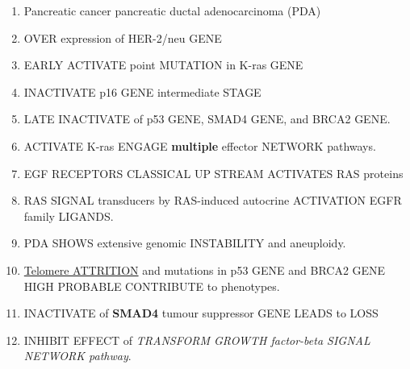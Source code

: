 \begin{enumerate}
	\item Pancreatic cancer pancreatic ductal adenocarcinoma (PDA) 
	\item OVER expression of HER-2/neu GENE
	\item EARLY ACTIVATE point MUTATION in K-ras GENE 
	\item INACTIVATE p16 GENE intermediate STAGE 
	\item LATE INACTIVATE of p53 GENE, SMAD4 GENE, and BRCA2 GENE. 
	\item ACTIVATE K-ras ENGAGE \textbf{multiple} effector NETWORK pathways.  
	\item EGF RECEPTORS CLASSICAL UP STREAM ACTIVATES RAS proteins
	\item RAS SIGNAL transducers by RAS-induced autocrine ACTIVATION EGFR family LIGANDS.
	\item PDA SHOWS extensive genomic INSTABILITY and aneuploidy.
	\item \underline{Telomere ATTRITION} and mutations in p53 GENE and BRCA2 GENE HIGH PROBABLE CONTRIBUTE to phenotypes. 
	\item INACTIVATE of \textbf{SMAD4} tumour suppressor GENE LEADS to LOSS 
	\item INHIBIT EFFECT of \textit{TRANSFORM GROWTH factor-beta SIGNAL NETWORK pathway}.
\end{enumerate}
